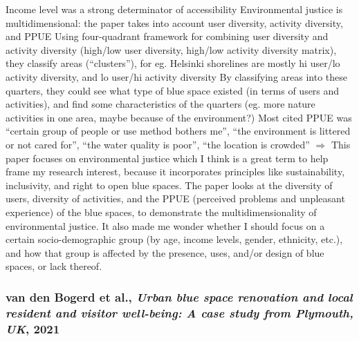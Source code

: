 \documentclass{article}
\begin{document}
\begin{outline}
		\2 Income level was a strong determinator of accessibility
	\1 Environmental justice is multidimensional: the paper takes into account user diversity, activity diversity, and PPUE
		\2 Using four-quadrant framework for combining user diversity and activity diversity (high/low user diversity, high/low activity diversity matrix), they classify areas (``clusters''), for eg. Helsinki shorelines are mostly hi user/lo activity diversity, and lo user/hi activity diversity
		\2 By classifying areas into these quarters, they could see what type of blue space existed (in terms of users and activities), and find some characteristics of the quarters (eg. more nature activities in one area, maybe because of the environment?)
	\1 Most cited PPUE was ``certain group of people or use method bothers me'', ``the environment is littered or not cared for'', ``the water quality is poor'', ``the location is crowded''
	\1 $\Rightarrow$ This paper focuses on environmental justice which I think is a great term to help frame my research interest, because it incorporates principles like sustainability, inclusivity, and right to open blue spaces. The paper looks at the diversity of users, diversity of activities, and the PPUE (perceived problems and unpleasant experience) of the blue spaces, to demonstrate the multidimensionality of environmental justice. It also made me wonder whether I should focus on a certain socio-demographic group (by age, income levels, gender, ethnicity, etc.), and  how that group is affected by the presence, uses, and/or design of blue spaces, or lack thereof. 

\end{outline}

\subsubsection{van den Bogerd et al., \textit{Urban blue space renovation and local resident and visitor well-being: A case study from Plymouth, UK}, 2021}

\parencite{van2021urban}
\end{document}
